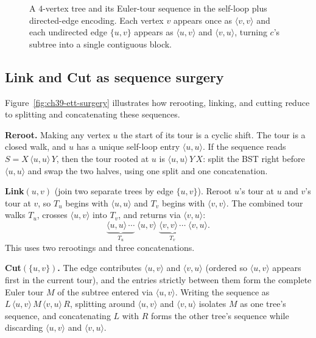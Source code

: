 \begin{figure}[htbp]
\caption{A $4$-vertex tree and its Euler-tour sequence in the self-loop plus directed-edge encoding. Each vertex $v$ appears once as $\langle v,v\rangle$ and each undirected edge $\{u,v\}$ appears as $\langle u,v\rangle$ and $\langle v,u\rangle$, turning $c$'s subtree into a single contiguous block.}
\label{ch39:fig-ett}
\end{figure}

\subsection*{Link and Cut as sequence surgery}

Figure~\ref{fig:ch39-ett-surgery} illustrates how rerooting, linking, and cutting
reduce to splitting and concatenating these sequences.

\begin{whybox}
\textbf{Reroot.} Making any vertex $u$ the start of its tour is a cyclic shift. The
tour is a closed walk, and $u$ has a unique self-loop entry $\langle u,u\rangle$. If
the sequence reads $S = X\,\langle u,u\rangle\,Y$, then the tour rooted at $u$ is
$\langle u,u\rangle\,Y\,X$: split the BST right before $\langle u,u\rangle$ and swap
the two halves, using one split and one concatenation.

\textbf{Link$(u,v)$} (join two separate trees by edge $\{u,v\}$). Reroot $u$'s tour at
$u$ and $v$'s tour at $v$, so $T_u$ begins with $\langle u,u\rangle$ and $T_v$ begins
with $\langle v,v\rangle$. The combined tour walks $T_u$, crosses $\langle u,v\rangle$
into $T_v$, and returns via $\langle v,u\rangle$:
\[
  \underbrace{\langle u,u\rangle\,\cdots}_{T_u}\; \langle u,v\rangle \;
  \underbrace{\langle v,v\rangle\,\cdots}_{T_v}\; \langle v,u\rangle.
\]
This uses two rerootings and three concatenations.

\textbf{Cut$(\{u,v\})$.} The edge contributes $\langle u,v\rangle$ and
$\langle v,u\rangle$ (ordered so $\langle u,v\rangle$ appears first in the current
tour), and the entries strictly between them form the complete Euler tour $M$ of the
subtree entered via $\langle u,v\rangle$. Writing the sequence as
$L\,\langle u,v\rangle\,M\,\langle v,u\rangle\,R$, splitting around
$\langle u,v\rangle$ and $\langle v,u\rangle$ isolates $M$ as one tree's sequence, and
concatenating $L$ with $R$ forms the other tree's sequence while discarding
$\langle u,v\rangle$ and $\langle v,u\rangle$.
\end{whybox}


